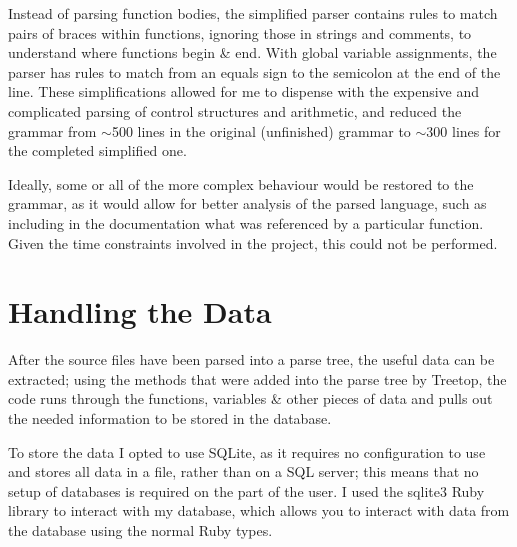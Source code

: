     Instead of parsing function bodies, the simplified parser contains rules to
    match pairs of braces within functions, ignoring those in strings and
    comments, to understand where functions begin \& end. With global variable
    assignments, the parser has rules to match from an equals sign to the
    semicolon at the end of the line. These simplifications allowed for me to
    dispense with the expensive and complicated parsing of control structures
    and arithmetic, and reduced the grammar from ${\sim}$500 lines in the
    original (unfinished) grammar to ${\sim}$300 lines for the completed
    simplified one.

    Ideally, some or all of the more complex behaviour would be restored to the
    grammar, as it would allow for better analysis of the parsed language, such
    as including in the documentation what was referenced by a particular
    function. Given the time constraints involved in the project, this could not
    be performed.

\section{Handling the Data}
After the source files have been parsed into a parse tree, the useful data can
be extracted; using the methods that were added into the parse tree by Treetop,
the code runs through the functions, variables \& other pieces of data and pulls
out the needed information to be stored in the database.

To store the data I opted to use SQLite, as it requires no configuration to use
and stores all data in a file, rather than on a SQL server; this means that no
setup of databases is required on the part of the user. I used the
sqlite3\cite{website:sqlite} Ruby library to interact with my database, which
allows you to interact with data from the database using the normal Ruby types.

\begin{center}
  \vspace*{5mm}
\end{center}

